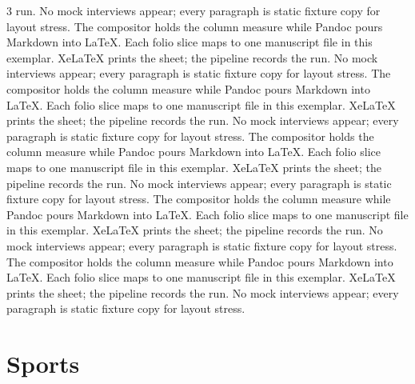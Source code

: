 \documentclass[
]{article}
\begin{document}
\begin{multicols}{3}
run. No mock interviews appear; every paragraph is static fixture copy
for layout stress. The compositor holds the column measure while Pandoc
pours Markdown into LaTeX. Each folio slice maps to one manuscript file
in this exemplar. XeLaTeX prints the sheet; the pipeline records the
run. No mock interviews appear; every paragraph is static fixture copy
for layout stress. The compositor holds the column measure while Pandoc
pours Markdown into LaTeX. Each folio slice maps to one manuscript file
in this exemplar. XeLaTeX prints the sheet; the pipeline records the
run. No mock interviews appear; every paragraph is static fixture copy
for layout stress. The compositor holds the column measure while Pandoc
pours Markdown into LaTeX. Each folio slice maps to one manuscript file
in this exemplar. XeLaTeX prints the sheet; the pipeline records the
run. No mock interviews appear; every paragraph is static fixture copy
for layout stress. The compositor holds the column measure while Pandoc
pours Markdown into LaTeX. Each folio slice maps to one manuscript file
in this exemplar. XeLaTeX prints the sheet; the pipeline records the
run. No mock interviews appear; every paragraph is static fixture copy
for layout stress. The compositor holds the column measure while Pandoc
pours Markdown into LaTeX. Each folio slice maps to one manuscript file
in this exemplar. XeLaTeX prints the sheet; the pipeline records the
run. No mock interviews appear; every paragraph is static fixture copy
for layout stress.

\end{multicols}

\newpage

\section{Sports}\label{sports}
\end{document}
